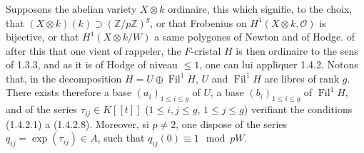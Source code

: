 \documentclass[12pt,a4paper]{article}
\theoremstyle{plain}
\theoremstyle{definition}
\theoremstyle{remark}
\DeclareMathOperator{\Fil}{Fil}
\begin{document}
\subsubsection{}
Supposons the abelian variety $X \otimes k$ ordinaire, this which signifie, to the choix, that $(X \otimes k)(k) \supset (\mathbb{Z}/p\mathbb{Z})^g$, or that Frobenius on $H^1(X \otimes k, \mathcal{O})$ is bijective, or that $H^1(X \otimes k/W)$ a same polygones of Newton and of Hodge. of after this that one vient of rappeler, the $F$-cristal $H$ is then ordinaire to the sens of 1.3.3, and as it is of Hodge of niveau $\leqslant 1$, one can lui appliquer 1.4.2. Notons that, in the decomposition $H = U \oplus \Fil^1 H$, $U$ and $\Fil^1 H$ are libres of rank $g$. There exists therefore a base $(a_i)_{1\leqslant i\leqslant g}$ of $U$, a base $(b_i)_{1\leqslant i\leqslant g}$ of $\Fil^1 H$, and of the series $\tau_{ij} \in K[[t]]$ ($1\leqslant i,j\leqslant g$, $1\leqslant j\leqslant g$) verifiant the conditions (1.4.2.1) a (1.4.2.8). Moreover, si $p \neq 2$, one dispose of the series $q_{ij} = \exp(\tau_{ij}) \in A$, such that $q_{ij}(0) \equiv 1 \mod pW$.
\end{document}
